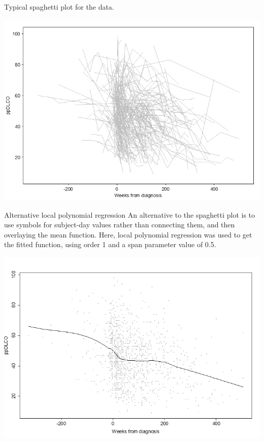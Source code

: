\documentclass[
  9pt,
  ignorenonframetext,
]{beamer}
\begin{document}
\begin{frame}{Typical spaghetti plot for the data.}
\protect\hypertarget{typical-spaghetti-plot-for-the-data.}{}
\tiny

\begin{center}\includegraphics[width=0.6\linewidth]{figs_L2/L2-f4} \end{center}

\tiny
\end{frame}

\begin{frame}{Alternative local polynomial regression}
\protect\hypertarget{alternative-local-polynomial-regression}{}
An alternative to the spaghetti plot is to use symbols for subject-day
values rather than connecting them, and then overlaying the mean
function. Here, local polynomial regression was used to get the fitted
function, using order 1 and a span parameter value of 0.5.

\tiny

\begin{center}\includegraphics[width=0.6\linewidth]{figs_L2/L2-f5} \end{center}

\tiny
\end{frame}
\end{document}
